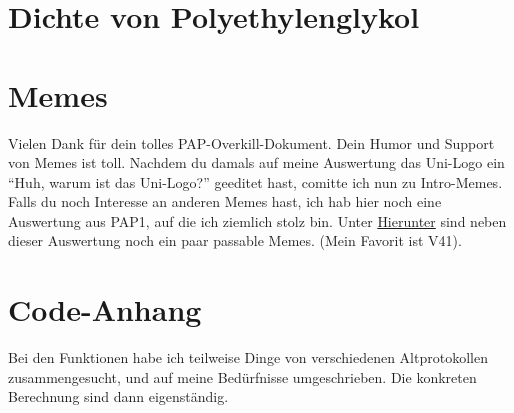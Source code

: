 \section{Dichte von Polyethylenglykol}

\section{Memes}
Vielen Dank für dein tolles PAP-Overkill-Dokument. Dein Humor und Support von Memes ist toll. Nachdem du damals auf meine Auswertung das Uni-Logo ein \enquote{Huh, warum ist das Uni-Logo?} geeditet hast, comitte ich nun zu Intro-Memes.\\
Falls du noch Interesse an anderen Memes hast, ich hab hier noch eine Auswertung aus PAP1, auf die ich ziemlich stolz bin. Unter \href{https://heibox.uni-heidelberg.de/d/498ecc34eb6b4365a538/}{Hierunter} sind neben dieser Auswertung noch ein paar passable Memes.
(Mein Favorit ist V41).

\section{Code-Anhang}
Bei den Funktionen habe ich teilweise Dinge von verschiedenen Altprotokollen zusammengesucht, und auf meine Bedürfnisse umgeschrieben. Die konkreten Berechnung sind dann eigenständig.
    
